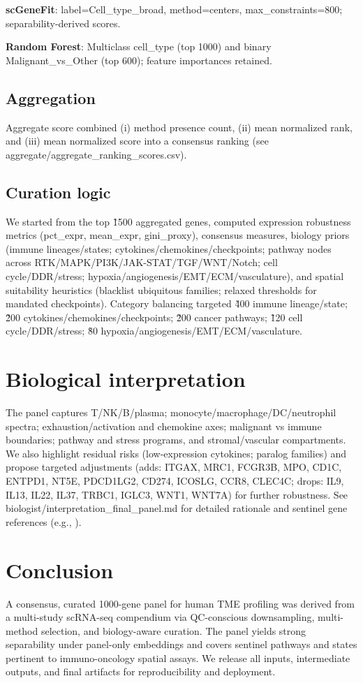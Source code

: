 \documentclass[11pt]{article}
\begin{document}
\textbf{scGeneFit}: label=Cell\_type\_broad, method=centers, max\_constraints=800; separability-derived scores.

\textbf{Random Forest}: Multiclass cell\_type (top 1000) and binary Malignant\_vs\_Other (top 600); feature importances retained.

\subsection{Aggregation}
Aggregate score combined (i) method presence count, (ii) mean normalized rank, and (iii) mean normalized score into a consensus ranking (see aggregate/aggregate\_ranking\_scores.csv).

\subsection{Curation logic}
We started from the top \~1500 aggregated genes, computed expression robustness metrics (pct\_expr, mean\_expr, gini\_proxy), consensus measures, biology priors (immune lineages/states; cytokines/chemokines/checkpoints; pathway nodes across RTK/MAPK/PI3K/JAK-STAT/TGF\beta/WNT/Notch; cell cycle/DDR/stress; hypoxia/angiogenesis/EMT/ECM/vasculature), and spatial suitability heuristics (blacklist ubiquitous families; relaxed thresholds for mandated checkpoints). Category balancing targeted \~400 immune lineage/state; \~200 cytokines/chemokines/checkpoints; \~200 cancer pathways; \~120 cell cycle/DDR/stress; \~80 hypoxia/angiogenesis/EMT/ECM/vasculature.

\section{Biological interpretation}
The panel captures T/NK/B/plasma; monocyte/macrophage/DC/neutrophil spectra; exhaustion/activation and chemokine axes; malignant vs immune boundaries; pathway and stress programs, and stromal/vascular compartments. We also highlight residual risks (low-expression cytokines; paralog families) and propose  targeted adjustments (adds: ITGAX, MRC1, FCGR3B, MPO, CD1C, ENTPD1, NT5E, PDCD1LG2, CD274, ICOSLG, CCR8, CLEC4C; drops: IL9, IL13, IL22, IL37, TRBC1, IGLC3, WNT1, WNT7A) for further robustness. See biologist/interpretation\_final\_panel.md for detailed rationale and sentinel gene references (e.g., \cite{GeneCards_CD3E,UniProt_CD3E,GeneCards_TRAC,UniProt_TRAC,GeneCards_PRF1,UniProt_PRF1}).

\section{Conclusion}
A consensus, curated 1000-gene panel for human TME profiling was derived from a multi-study scRNA-seq compendium via QC-conscious downsampling, multi-method selection, and biology-aware curation. The panel yields strong separability under panel-only embeddings and covers sentinel pathways and states pertinent to immuno-oncology spatial assays. We release all inputs, intermediate outputs, and final artifacts for reproducibility and deployment.
\end{document}
